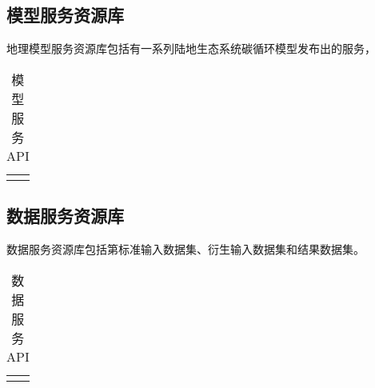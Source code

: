 
\subsection{模型服务资源库}
地理模型服务资源库包括有一系列陆地生态系统碳循环模型发布出的服务，

\begin{table}
    \centering
    \caption{模型服务API}
    \label{tab:model-service-API}
    \begin{threeparttable}
        \begin{tabu} to 1
            \Xhline{1.5pt}
            \Xhline{1.5pt}
            \Xhline{1.5pt}
        \end{tabu}
    \end{threeparttable}
\end{table}

\subsection{数据服务资源库}

数据服务资源库包括第标准输入数据集、衍生输入数据集和结果数据集。

\begin{table}
    \centering
    \caption{数据服务API}
    \label{tab:model-service-API}
    \begin{threeparttable}
        \begin{tabu} to 1
            \Xhline{1.5pt}
            \Xhline{1.5pt}
            \Xhline{1.5pt}
        \end{tabu}
    \end{threeparttable}
\end{table}

